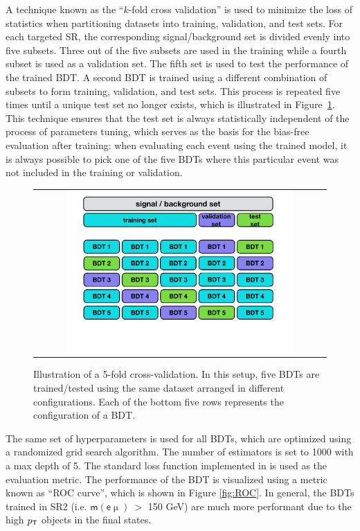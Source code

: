 A technique known as the ``$k$-fold cross validation'' is used to minimize the loss of statistics when partitioning datasets into training, validation, and test sets. For each targeted \ac{SR}, the corresponding signal/background set is divided evenly into five subsets. Three out of the five subsets are used in the training while a fourth subset is used as a validation set. The fifth set is used to test the performance of the trained \ac{BDT}. A second \ac{BDT} is trained using a different combination of subsets to form training, validation, and test sets. This process is repeated five times until a unique test set no longer exists, which is illustrated in Figure~\ref{fig:5fold}. This technique ensures that the test set is always statistically independent of the process of parameters tuning, which serves as the basis for the bias-free evaluation after training: when evaluating each event using the trained model, it is always possible to pick one of the five \acp{BDT} where this particular event was not included in the training or validation.

\begin{figure}[tbh!]
 \begin{center}
 \begin{tabular}{c}
 \includegraphics[width=0.8\textwidth]{figures/Part3/BDT/kfold}
 \end{tabular}
   \caption{Illustration of a 5-fold cross-validation. In this setup, five \acp{BDT} are trained/tested using the same dataset arranged in different configurations. Each of the bottom five rows represents the configuration of a \ac{BDT}.}
 \label{fig:5fold}
 \end{center}
\end{figure}

The same set of hyperparameters is used for all \acp{BDT}, which are optimized using a randomized grid search algorithm. The number of estimators is set to 1000 with a max depth of 5. The standard loss function implemented in \cite{Chen:2016:XST:2939672.2939785} is used as the evaluation metric. The performance of the \ac{BDT} is visualized using a metric known as ``\ac{ROC} curve'', which is shown in Figure \ref{fig:ROC}. In general, the \acp{BDT} trained in \ac{SR}2 (i.e. $\textsf{m}(\textsf{e}\upmu)~>$ 150 GeV) are much more performant due to the high $p_{\textsf{T}}$ objects in the final states.

